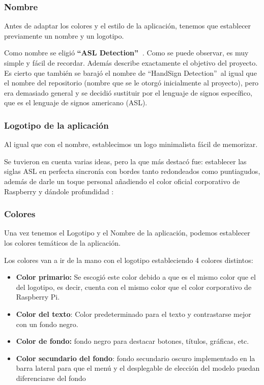 \subsubsection{Nombre}
Antes de adaptar los colores y el estilo de la aplicación, tenemos que establecer previamente un nombre y un logotipo.

Como nombre se eligió \textbf{``ASL Detection''\ }. Como se puede observar, es muy simple y fácil de recordar. Además describe exactamente el objetivo del proyecto. Es cierto que también se barajó el nombre de ``HandSign Detection''\ al igual que el nombre del repositorio (nombre que se le otorgó inicialmente al proyecto), pero era demasiado general y se decidió sustituir por el lenguaje de signos específico, que es el lenguaje de signos americano (ASL).

\subsubsection{Logotipo de la aplicación}
Al igual que con el nombre, establecimos un logo minimalista fácil de memorizar. 

Se tuvieron en cuenta varias ideas, pero la que más destacó fue: establecer las siglas ASL en perfecta sincronía con bordes tanto redondeados como puntiagudos, además de darle un toque personal añadiendo el color oficial corporativo de Raspberry y dándole profundidad \cite{web:raspberrypi_colours_an}:


\subsubsection{Colores}
Una vez tenemos el Logotipo y el Nombre de la aplicación, podemos establecer los colores temáticos de la aplicación.

Los colores van a ir de la mano con el logotipo estableciendo 4 colores distintos:


\begin{itemize}
    \item \textbf{Color primario:} Se escogió este color debido a que es el mismo color que el del logotipo, es decir, cuenta con el mismo color que el color corporativo de Raspberry Pi.
    \item \textbf{Color del texto}: Color predeterminado para el texto y contrastarse mejor con un fondo negro.
    \item \textbf{Color de fondo:} fondo negro para destacar botones, títulos, gráficas, etc.
    \item \textbf{Color secundario del fondo}: fondo secundario oscuro implementado en la barra lateral para que el menú y el desplegable de elección del modelo puedan diferenciarse del fondo
\end{itemize}


